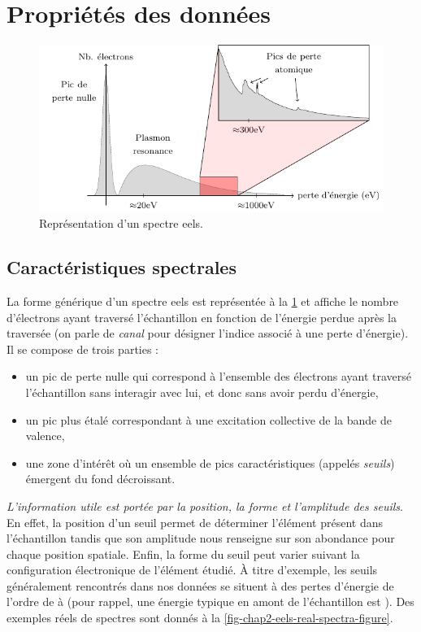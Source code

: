     \section{Propriétés des données }\label{sec-prop-eels}

    \begin{figure}[t]
        \centering
        \includegraphics[]{img/chapitre1/figure5/eels-spectrum-shape.pdf}
        \caption{Représentation d'un spectre \gls{eels}.
            \protect\label{fig-chap2-eels-spectrum-shape}}
    \end{figure}

    \subsection{Caractéristiques spectrales} La forme générique d'un spectre \gls{eels} est représentée à la \cref{fig-chap2-eels-spectrum-shape} et affiche le nombre d'électrons ayant traversé l'échantillon en fonction de l'énergie perdue après la traversée (on parle de \emph{canal} pour désigner l'indice associé à une perte d'énergie). Il se compose de trois parties :
    \begin{itemize}
    	\item un pic de perte nulle qui correspond à l'ensemble des électrons ayant traversé l'échantillon sans interagir avec lui, et donc sans avoir perdu d'énergie,
    	\item un pic plus étalé correspondant à une excitation collective de la bande de valence,
    	\item une zone d'intérêt où un ensemble de pics caractéristiques (appelés \emph{seuils}) émergent du fond décroissant.
    \end{itemize}
    \emph{L'information utile est portée par la position, la forme et l'amplitude des seuils}. En effet, la position d'un seuil permet de déterminer l'élément présent dans l'échantillon tandis que son amplitude nous renseigne sur son abondance pour chaque position spatiale. Enfin, la forme du seuil peut varier suivant la configuration électronique de l'élément étudié.
    \`A titre d'exemple, les seuils généralement rencontrés dans nos données se situent à des pertes d'énergie de l'ordre de  à  (pour rappel, une énergie typique en amont de l'échantillon est ).
    Des exemples réels de spectres sont donnés à la \cref{fig-chap2-eels-real-spectra-figure}.


